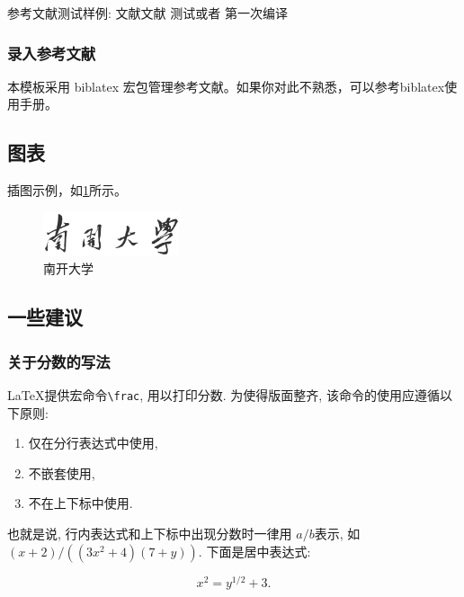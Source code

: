 \documentclass{nktba}
\begin{document}
参考文献测试样例:
\cite{ChenCheChen2001,Nadkarni-1992,Hua-Wang-1973}
文献\cite{ZhuKeZhen,Huo}文献\cite{JiangXiZhou,Timoshenko,Zhang-Wang}
\cite{ZhuKeZhen}
测试\citep{PQEMU}或者\citep{li1988ivy}
第一次编译\cite{hong2012hqemu}\cite{zaharia2010spark}\cite{wenwenasplos2018}

\subsubsection{录入参考文献}

本模板采用 biblatex 宏包管理参考文献。如果你对此不熟悉，可以参考biblatex使用手册。

\subsection{图表}

插图示例，如\ref{fig:nku}所示。

\begin{figure}
\centering
\includegraphics[viewport=0 0 2984 969,width=40mm]{figures/nankaidaxue.pdf}
\caption{南开大学}
\label{fig:nku}
\end{figure}

\subsection{一些建议}
\subsubsection{关于分数的写法}

\LaTeX 提供宏命令\verb+\frac+, 用以打印分数. 为使得版面整齐, 该命令的使用应遵循以下原则:

\begin{enumerate}
\item 仅在分行表达式中使用,
\item 不嵌套使用,
\item 不在上下标中使用.
\end{enumerate}

也就是说, 行内表达式和上下标中出现分数时一律用 $a/b$表示, 如
$(x+2)/((3x^2+4)(7+y))$. 下面是居中表达式:

\[
 x^2 = y^{1/2} +3.
\]
\end{document}
